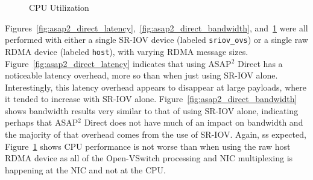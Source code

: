 \documentclass[12pt,titlepage]{article}
\begin{document}
\begin{figure}
	\centering
	\caption{CPU Utilization}%
	\label{fig:asap2_direct_cpu}
\end{figure}

Figures~\ref{fig:asap2_direct_latency},~\ref{fig:asap2_direct_bandwidth}, and~\ref{fig:asap2_direct_cpu} were all performed with either a single SR-IOV device (labeled \texttt{sriov\_ovs}) or a single raw RDMA device (labeled \texttt{host}), with varying RDMA message sizes.
Figure~\ref{fig:asap2_direct_latency} indicates that using ASAP$^2$ Direct has a noticeable latency overhead, more so than when just using SR-IOV alone. 
Interestingly, this latency overhead appears to disappear at large payloads, where it tended to increase with SR-IOV alone.
Figure~\ref{fig:asap2_direct_bandwidth} shows bandwidth results very similar to that of using SR-IOV alone, indicating perhaps that ASAP$^2$ Direct does not have much of an impact on bandwidth and the majority of that overhead comes from the use of SR-IOV.
Again, ss expected, Figure~\ref{fig:asap2_direct_cpu} shows CPU performance is not worse than when using the raw host RDMA device as all of the Open-VSwitch processing and NIC multiplexing is happening at the NIC and not at the CPU.

\end{document}
